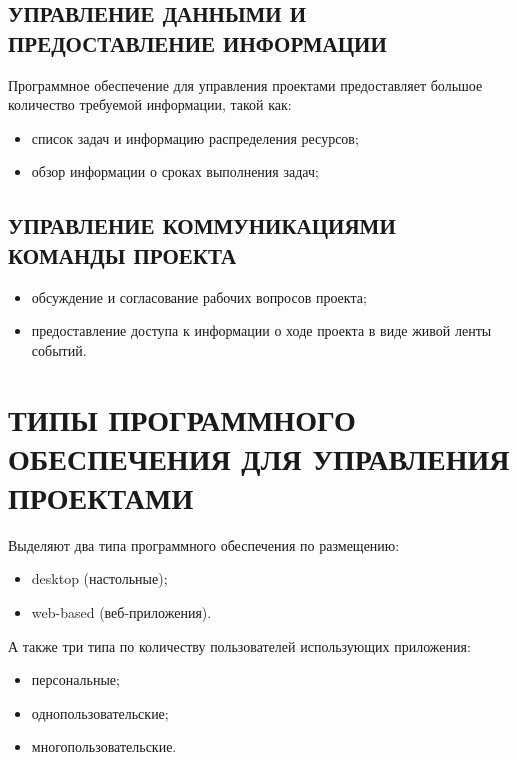 \documentclass[14pt, a4paper]{extreport}
\begin{document}
\subsection{\MakeTextUppercase{Управление данными и предоставление информации}}
Программное обеспечение для управления проектами предоставляет большое количество
требуемой информации, такой как:
\begin{itemize}
  \item список задач и информацию распределения ресурсов;
  \item обзор информации о сроках выполнения задач;
\end{itemize}

\subsection{\MakeTextUppercase{Управление коммуникациями команды проекта}}
\begin{itemize}
  \item обсуждение и согласование рабочих вопросов проекта;
  \item предоставление доступа к информации о ходе проекта в виде живой ленты событий.
\end{itemize}

\section{\MakeTextUppercase{Типы программного обеспечения для управления проектами}}
Выделяют два типа программного обеспечения по размещению:
\begin{itemize}
  \item desktop (настольные);
  \item web-based (веб-приложения).
\end{itemize}

А также три типа по количеству пользователей использующих приложения:
\begin{itemize}
  \item персональные;
  \item однопользовательские;
  \item многопользовательские.
\end{itemize}
\end{document}
